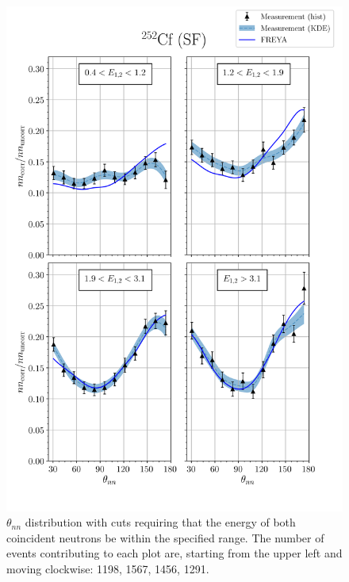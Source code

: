 \begin{figure}
\centering
    \includegraphics[width = \textwidth]{Content/Results/FinalCf252Resultw_freya2KDE.png}
    \caption{$\theta_{nn}$ distribution with cuts requiring that the energy of both coincident neutrons be within the specified range.
    The number of events contributing to each plot are, starting from the upper left and moving clockwise: 1198, 1567, 1456, 1291.}
    \label{fig:Cf(2)}
\end{figure}
